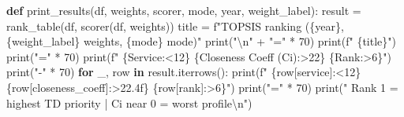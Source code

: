 \documentclass[
  12pt,
  letterpaper,
  12pt,
  oneside,
  english,
  onehalfspacing,
  headsepline]{MastersDoctoralThesis}
\newenvironment{Shaded}{\begin{snugshade}}{\end{snugshade}}
\newcommand{\BuiltInTok}[1]{\textcolor[rgb]{0.00,0.23,0.31}{#1}}
\newcommand{\CharTok}[1]{\textcolor[rgb]{0.13,0.47,0.30}{#1}}
\newcommand{\ControlFlowTok}[1]{\textcolor[rgb]{0.00,0.23,0.31}{\textbf{#1}}}
\newcommand{\DecValTok}[1]{\textcolor[rgb]{0.68,0.00,0.00}{#1}}
\newcommand{\KeywordTok}[1]{\textcolor[rgb]{0.00,0.23,0.31}{\textbf{#1}}}
\newcommand{\NormalTok}[1]{\textcolor[rgb]{0.00,0.23,0.31}{#1}}
\newcommand{\OperatorTok}[1]{\textcolor[rgb]{0.37,0.37,0.37}{#1}}
\newcommand{\SpecialCharTok}[1]{\textcolor[rgb]{0.37,0.37,0.37}{#1}}
\newcommand{\SpecialStringTok}[1]{\textcolor[rgb]{0.13,0.47,0.30}{#1}}
\newcommand{\StringTok}[1]{\textcolor[rgb]{0.13,0.47,0.30}{#1}}
\begin{document}
\begin{Shaded}
\begin{Highlighting}[]
\KeywordTok{def}\NormalTok{ print\_results(df, weights, scorer, mode, year, weight\_label):}
\NormalTok{    result }\OperatorTok{=}\NormalTok{ rank\_table(df, scorer(df, weights))}
\NormalTok{    title }\OperatorTok{=} \SpecialStringTok{f"TOPSIS ranking (}\SpecialCharTok{\{}\NormalTok{year}\SpecialCharTok{\}}\SpecialStringTok{, }\SpecialCharTok{\{}\NormalTok{weight\_label}\SpecialCharTok{\}}\SpecialStringTok{ weights, }\SpecialCharTok{\{}\NormalTok{mode}\SpecialCharTok{\}}\SpecialStringTok{ mode)"}
    \BuiltInTok{print}\NormalTok{(}\StringTok{"}\CharTok{\textbackslash{}n}\StringTok{"} \OperatorTok{+} \StringTok{"="} \OperatorTok{*} \DecValTok{70}\NormalTok{)}
    \BuiltInTok{print}\NormalTok{(}\SpecialStringTok{f"  }\SpecialCharTok{\{}\NormalTok{title}\SpecialCharTok{\}}\SpecialStringTok{"}\NormalTok{)}
    \BuiltInTok{print}\NormalTok{(}\StringTok{"="} \OperatorTok{*} \DecValTok{70}\NormalTok{)}
    \BuiltInTok{print}\NormalTok{(}\SpecialStringTok{f"  }\SpecialCharTok{\{}\StringTok{\textquotesingle{}Service\textquotesingle{}}\SpecialCharTok{:\textless{}12\}}\SpecialStringTok{ }\SpecialCharTok{\{}\StringTok{\textquotesingle{}Closeness Coeff (Ci)\textquotesingle{}}\SpecialCharTok{:\textgreater{}22\}}\SpecialStringTok{ }\SpecialCharTok{\{}\StringTok{\textquotesingle{}Rank\textquotesingle{}}\SpecialCharTok{:\textgreater{}6\}}\SpecialStringTok{"}\NormalTok{)}
    \BuiltInTok{print}\NormalTok{(}\StringTok{"{-}"} \OperatorTok{*} \DecValTok{70}\NormalTok{)}
    \ControlFlowTok{for}\NormalTok{ \_, row }\KeywordTok{in}\NormalTok{ result.iterrows():}
        \BuiltInTok{print}\NormalTok{(}\SpecialStringTok{f"  }\SpecialCharTok{\{}\NormalTok{row[}\StringTok{\textquotesingle{}service\textquotesingle{}}\NormalTok{]}\SpecialCharTok{:\textless{}12\}}\SpecialStringTok{ }\SpecialCharTok{\{}\NormalTok{row[}\StringTok{\textquotesingle{}closeness\_coeff\textquotesingle{}}\NormalTok{]}\SpecialCharTok{:\textgreater{}22.4f\}}\SpecialStringTok{ }\SpecialCharTok{\{}\NormalTok{row[}\StringTok{\textquotesingle{}rank\textquotesingle{}}\NormalTok{]}\SpecialCharTok{:\textgreater{}6\}}\SpecialStringTok{"}\NormalTok{)}
    \BuiltInTok{print}\NormalTok{(}\StringTok{"="} \OperatorTok{*} \DecValTok{70}\NormalTok{)}
    \BuiltInTok{print}\NormalTok{(}\StringTok{"  Rank 1 = highest TD priority  |  Ci near 0 = worst profile}\CharTok{\textbackslash{}n}\StringTok{"}\NormalTok{)}



\end{Highlighting}
\end{Shaded}
\end{document}
